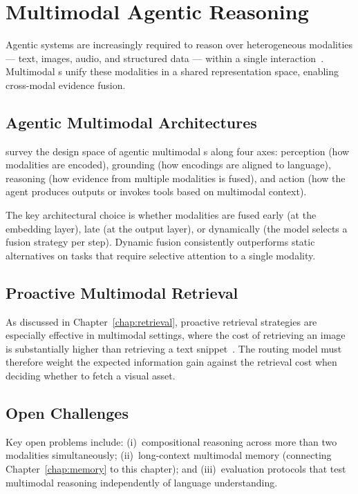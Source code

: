 \chapter{Multimodal Agentic Reasoning}
\label{chap:multimodal}

Agentic systems are increasingly required to reason over heterogeneous
modalities — text, images, audio, and structured data — within a single
interaction~\cite{yao2025multimodalsurvey}.
Multimodal \LLM{}s unify these modalities in a shared representation space,
enabling cross-modal evidence fusion.

\section{Agentic Multimodal Architectures}
\label{sec:multimodal-arch}

\cite{yao2025multimodalsurvey} survey the design space of agentic multimodal
\LLM{}s along four axes: perception (how modalities are encoded), grounding
(how encodings are aligned to language), reasoning (how evidence from multiple
modalities is fused), and action (how the agent produces outputs or invokes
tools based on multimodal context).

The key architectural choice is whether modalities are fused early (at the
embedding layer), late (at the output layer), or dynamically (the model
selects a fusion strategy per step).
Dynamic fusion consistently outperforms static alternatives on tasks that
require selective attention to a single modality.

\section{Proactive Multimodal Retrieval}
\label{sec:multimodal-retrieval}

As discussed in Chapter~\ref{chap:retrieval}, proactive retrieval strategies
are especially effective in multimodal settings, where the cost of
retrieving an image is substantially higher than retrieving a text
snippet~\cite{wang2025proactiveretrievalmedical}.
The routing model must therefore weight the expected information gain
against the retrieval cost when deciding whether to fetch a visual asset.

\section{Open Challenges}
\label{sec:multimodal-challenges}

Key open problems include: (i)~compositional reasoning across more than two
modalities simultaneously; (ii)~long-context multimodal memory (connecting
Chapter~\ref{chap:memory} to this chapter); and (iii)~evaluation protocols
that test multimodal reasoning independently of language understanding.
